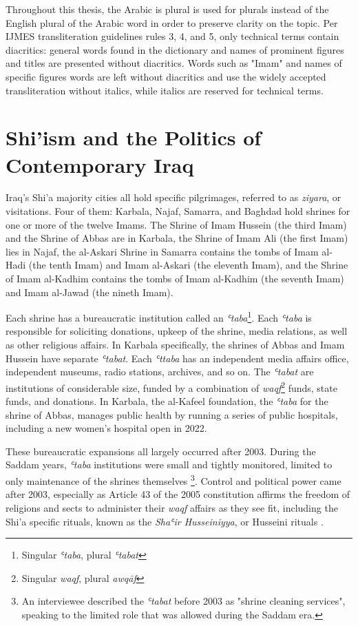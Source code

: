 Throughout this thesis, the Arabic is plural is used for plurals instead of the English plural of the Arabic word in order to preserve clarity on the topic. Per IJMES transliteration guidelines rules 3, 4, and 5, only technical terms contain diacritics: general words found in the dictionary and names of prominent figures and titles are presented without diacritics. Words such as "Imam" and names of specific figures words are left without diacritics and use the widely accepted transliteration without italics, while italics are reserved for technical terms.

\section{Shi'ism and the Politics of Contemporary Iraq}
Iraq's Shi'a majority cities all hold specific pilgrimages, referred to as \emph{ziyara}, or visitations. Four of them: Karbala, Najaf, Samarra, and Baghdad hold shrines for one or more of the twelve Imams. The Shrine of Imam Hussein (the third Imam) and the Shrine of Abbas are in Karbala, the Shrine of Imam Ali (the first Imam) lies in Najaf, the al-Askari Shrine in Samarra contains the tombs of Imam al-Hadi (the tenth Imam) and Imam al-Askari (the eleventh Imam), and the Shrine of Imam al-Kadhim contains the tombs of Imam al-Kadhim (the seventh Imam) and Imam al-Jawad (the nineth Imam). 

Each shrine has a bureaucratic institution called an \emph{ʿtaba}\footnote{Singular \emph{ʿtaba}, plural \emph{ʿtabat}}. Each \emph{ʿtaba} is responsible for soliciting donations, upkeep of the shrine, media relations, as well as other religious affairs. In Karbala specifically, the shrines of Abbas and Imam Hussein have separate \emph{ʿtabat}. Each \emph{ʿttaba} has an independent media affairs office, independent museums, radio stations, archives, and so on. The \emph{ʿtabat} are institutions of considerable size, funded by a combination of \emph{waqf}\footnote{Singular \emph{waqf}, plural \emph{awqāf}} funds, state funds, and donations. In Karbala, the al-Kafeel foundation, the \emph{ʿtaba} for the shrine of Abbas, manages public health by running a series of public hospitals, including a new women's hospital open in 2022. 

These bureaucratic expansions all largely occurred after 2003. During the Saddam years, \emph{ʿtaba} institutions were small and tightly monitored, limited to only maintenance of the shrines themselves \footnote{An interviewee described the \emph{ʿtabat} before 2003 as "shrine cleaning services", speaking to the limited role that was allowed during the Saddam era.}. Control and political power came after 2003, especially as Article 43 of the 2005 constitution affirms the freedom of religions and sects to administer their \emph{waqf} affairs as they see fit, including the Shi'a specific rituals, known as the \emph{Shaʿir Husseiniyya}, or Husseini rituals \cite{jawad_iraqi_2003}. 

